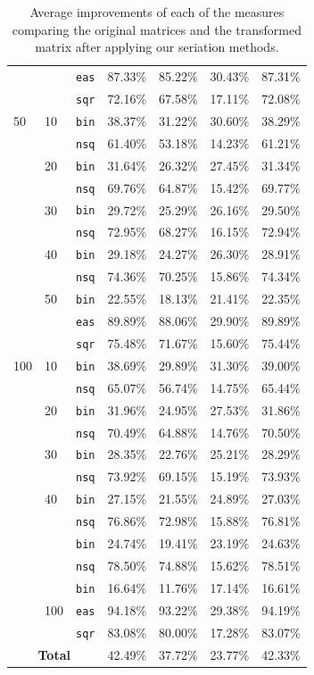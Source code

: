 \documentclass[a4paper,11pt, reqno]{amsart}
\begin{document}
\begin{table}[htbp]
\begin{tabular}{|l|l|l|l|l|l|l|}
 &  & \texttt{eas} & 87.33\% & 85.22\% & 30.43\% & 87.31\% \\
 &  & \texttt{sqr} & 72.16\% & 67.58\% & 17.11\% & 72.08\% \\
\hline
{50} & 10 & \texttt{bin} & 38.37\% & 31.22\% & 30.60\% & 38.29\% \\
 &  & \texttt{nsq} & 61.40\% & 53.18\% & 14.23\% & 61.21\% \\
 & 20 & \texttt{bin} & 31.64\% & 26.32\% & 27.45\% & 31.34\% \\
 &  & \texttt{nsq} & 69.76\% & 64.87\% & 15.42\% & 69.77\% \\
 & 30 & \texttt{bin} & 29.72\% & 25.29\% & 26.16\% & 29.50\% \\
 &  & \texttt{nsq} & 72.95\% & 68.27\% & 16.15\% & 72.94\% \\
 & 40 & \texttt{bin} & 29.18\% & 24.27\% & 26.30\% & 28.91\% \\
 &  & \texttt{nsq} & 74.36\% & 70.25\% & 15.86\% & 74.34\% \\
 & 50 & \texttt{bin} & 22.55\% & 18.13\% & 21.41\% & 22.35\% \\
 &  & \texttt{eas} & 89.89\% & 88.06\% & 29.90\% & 89.89\% \\
 &  & \texttt{sqr} & 75.48\% & 71.67\% & 15.60\% & 75.44\% \\\hline
{100} & 10 & \texttt{bin} & 38.69\% & 29.89\% & 31.30\% & 39.00\% \\
 &  & \texttt{nsq} & 65.07\% & 56.74\% & 14.75\% & 65.44\% \\
 & 20 & \texttt{bin} & 31.96\% & 24.95\% & 27.53\% & 31.86\% \\
 &  & \texttt{nsq} & 70.49\% & 64.88\% & 14.76\% & 70.50\% \\
 & 30 & \texttt{bin} & 28.35\% & 22.76\% & 25.21\% & 28.29\% \\
 &  & \texttt{nsq} & 73.92\% & 69.15\% & 15.19\% & 73.93\% \\
 & 40 & \texttt{bin} & 27.15\% & 21.55\% & 24.89\% & 27.03\% \\
 &  & \texttt{nsq} & 76.86\% & 72.98\% & 15.88\% & 76.81\% \\
 &  & \texttt{bin} & 24.74\% & 19.41\% & 23.19\% & 24.63\% \\
 &  & \texttt{nsq} & 78.50\% & 74.88\% & 15.62\% & 78.51\% \\
 & \multirow{3}{*}{100} & \texttt{bin} & 16.64\% & 11.76\% & 17.14\% & 16.61\% \\
 &  & \texttt{eas} & 94.18\% & 93.22\% & 29.38\% & 94.19\% \\
 &  & \texttt{sqr} & 83.08\% & 80.00\% & 17.28\% & 83.07\% \\
\hline\multicolumn{3}{|c|}{\bf Total} & 42.49\% & 37.72\% & 23.77\% & 42.33\% \\
\hline
\end{tabular}
\caption{Average improvements of each of the measures comparing the original matrices and the transformed matrix after applying our seriation methods.}
\label{t:tab_devs}
\end{table}
\end{document}
